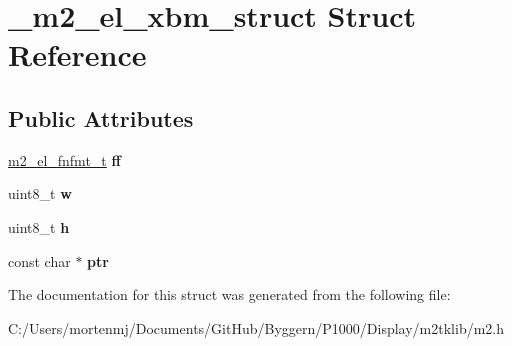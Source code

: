 \hypertarget{struct__m2__el__xbm__struct}{\section{\-\_\-m2\-\_\-el\-\_\-xbm\-\_\-struct Struct Reference}
\label{struct__m2__el__xbm__struct}
}
\subsection*{Public Attributes}
\begin{DoxyCompactItemize}
\item 
\hypertarget{struct__m2__el__xbm__struct_a327b31adef12d8d784166c7be7ab88c4}{\hyperlink{struct__m2__el__fnfmt__struct}{m2\-\_\-el\-\_\-fnfmt\-\_\-t} {\bfseries ff}}\label{struct__m2__el__xbm__struct_a327b31adef12d8d784166c7be7ab88c4}

\item 
\hypertarget{struct__m2__el__xbm__struct_a3b953dcb219c000867908ec159e03509}{uint8\-\_\-t {\bfseries w}}\label{struct__m2__el__xbm__struct_a3b953dcb219c000867908ec159e03509}

\item 
\hypertarget{struct__m2__el__xbm__struct_a2232f0a8a1491e649a42511ac7108fa7}{uint8\-\_\-t {\bfseries h}}\label{struct__m2__el__xbm__struct_a2232f0a8a1491e649a42511ac7108fa7}

\item 
\hypertarget{struct__m2__el__xbm__struct_ad8ddaa1235b04c70485eab665fe85251}{const char $\ast$ {\bfseries ptr}}\label{struct__m2__el__xbm__struct_ad8ddaa1235b04c70485eab665fe85251}

\end{DoxyCompactItemize}


The documentation for this struct was generated from the following file\-:\begin{DoxyCompactItemize}
\item 
C\-:/\-Users/mortenmj/\-Documents/\-Git\-Hub/\-Byggern/\-P1000/\-Display/m2tklib/m2.\-h\end{DoxyCompactItemize}
